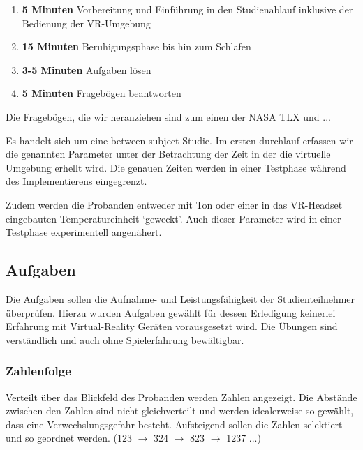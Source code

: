 \begin{enumerate}
	\item \textbf{5 Minuten} Vorbereitung und Einführung in den Studienablauf inklusive der Bedienung der VR-Umgebung
	\item \textbf{15 Minuten} Beruhigungsphase bis hin zum Schlafen
	\item \textbf{3-5 Minuten} Aufgaben lösen
	\item \textbf{5 Minuten} Fragebögen beantworten
\end{enumerate}

Die Fragebögen, die wir heranziehen sind zum einen der NASA TLX und ...

Es handelt sich um eine between subject Studie. Im ersten durchlauf erfassen wir die genannten Parameter unter der Betrachtung der Zeit in der die virtuelle Umgebung erhellt wird. Die genauen Zeiten werden in einer Testphase während des Implementierens eingegrenzt.

Zudem werden die Probanden entweder mit Ton oder einer in das VR-Headset eingebauten Temperatureinheit `geweckt'. Auch dieser Parameter wird in einer Testphase experimentell angenähert.

\subsection{Aufgaben}
Die Aufgaben sollen die Aufnahme- und Leistungsfähigkeit der Studienteilnehmer überprüfen. Hierzu wurden Aufgaben gewählt für dessen Erledigung keinerlei Erfahrung mit Virtual-Reality Geräten vorausgesetzt wird. Die Übungen sind verständlich und auch ohne Spielerfahrung bewältigbar. 

\subsubsection{Zahlenfolge} 
Verteilt über das Blickfeld des Probanden werden Zahlen angezeigt. Die Abstände zwischen den Zahlen sind nicht gleichverteilt und werden idealerweise so gewählt, dass eine Verwechslungsgefahr besteht. Aufsteigend sollen die Zahlen selektiert und so geordnet werden. (123 $\rightarrow$ 324 $\rightarrow$ 823 $\rightarrow$ 1237 ...)

